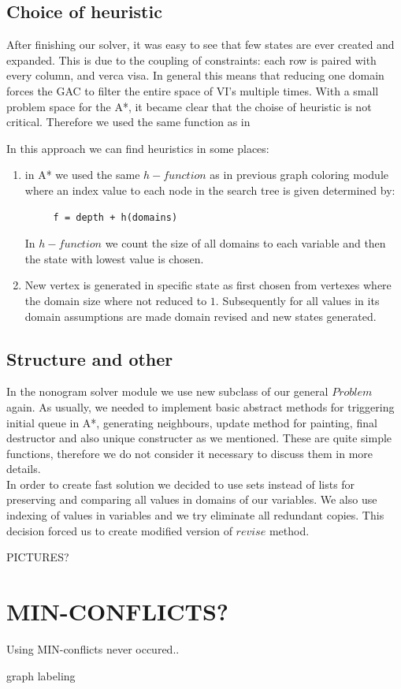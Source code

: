 \documentclass[journal]{IEEEtran}
\begin{document}
\subsection{Choice of heuristic}
After finishing our solver, it was easy to see that few states are ever created and
expanded. This is due to the coupling of constraints: each row is paired
with every column, and verca visa. In general this means that reducing one domain forces
the GAC to filter the entire space of VI's multiple times.
With a small problem space for the A*, it became clear that the
choise of heuristic is not critical. Therefore we used the same function 
as in \dotso

In this approach we can find heuristics in some places:
\begin{enumerate}
    \item in A* we used the same $h-function$ as in previous graph coloring module where an index value to each node 
    in the search tree is given determined by:
    \begin{verbatim}
     f = depth + h(domains)
     \end{verbatim}
     In $h-function$ we count the size of all domains to each variable and then the state with lowest value is chosen.\\
    \item New vertex is generated in specific state as first chosen from vertexes where the domain size where not
    reduced to $1$. Subsequently for all values in its domain assumptions are made domain revised and new states
    generated.
\end{enumerate}

\subsection{Structure and other}
In the nonogram solver module we use new subclass of our general $Problem$ again. As usually, we needed 
to implement basic abstract methods for triggering initial queue in A*, generating neighbours, update method for painting, 
final destructor and also unique constructer as we mentioned. These are quite simple functions, therefore we do 
not consider it necessary to discuss them in more details.\\

In order to create fast solution we decided to use sets instead of lists for preserving and comparing all values in 
domains of our variables. We also use indexing of values in variables and we try eliminate all redundant copies. 
This decision forced us to create modified version of $revise$ method.



PICTURES?

\section{MIN-CONFLICTS?}
Using MIN-conflicts never occured..

graph labeling
\end{document}
